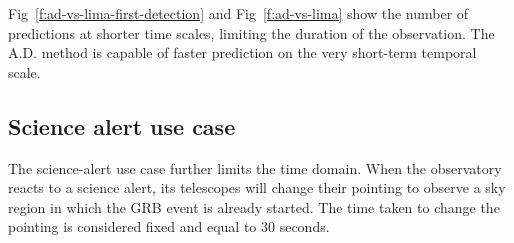 Fig~\ref{f:ad-vs-lima-first-detection} and Fig~\ref{f:ad-vs-lima} show the number of predictions at shorter time scales, limiting the duration of the observation. 
The A.D. method is capable of faster prediction on the very short-term temporal scale.  












\subsection{Science alert use case}
\label{s:Science-Alert-Results}
The science-alert use case further limits the time domain. When the observatory reacts to a science alert, its telescopes will change their pointing to observe a sky region in which the GRB event is already started. The time taken to change the pointing is considered fixed and equal to 30 seconds.  



